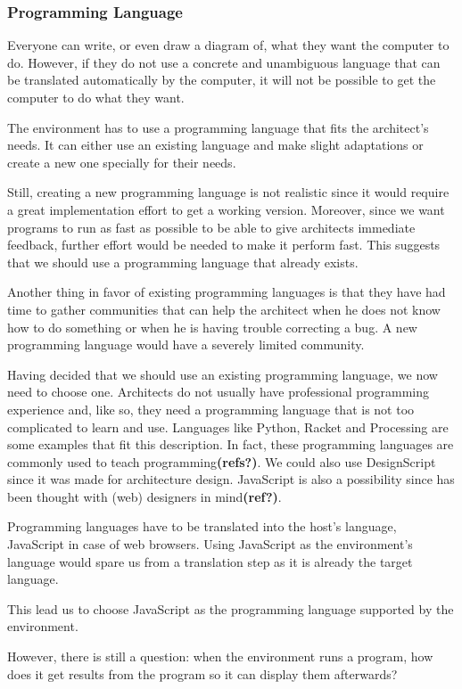 \subsubsection{Programming Language}
Everyone can write, or even draw a diagram of, what they want the computer to do.
However, if they do not use a concrete and unambiguous language that can be translated automatically by the computer, it will not be possible to get the computer to do what they want.

The environment has to use a programming language that fits the architect's needs.
It can either use an existing language and make slight adaptations or create a new one specially for their needs.

Still, creating a new programming language is not realistic since it would require a great implementation effort to get a working version.
Moreover, since we want programs to run as fast as possible to be able to give architects immediate feedback, further effort would be needed to make it perform fast.
This suggests that we should use a programming language that already exists.

Another thing in favor of existing programming languages is that they have had time to gather communities that can help the architect when he does not know how to do something or when he is having trouble correcting a bug.
A new programming language would have a severely limited community.

Having decided that we should use an existing programming language, we now need to choose one.
Architects do not usually have professional programming experience and, like so, they need a programming language that is not too complicated to learn and use.
Languages like Python, Racket and Processing are some examples that fit this description.
In fact, these programming languages are commonly used to teach programming{\bf(refs?)}.
We could also use DesignScript since it was made for architecture design\cite{aish2012designscript}.
JavaScript is also a possibility since has been thought with (web) designers in mind{\bf(ref?)}.

Programming languages have to be translated into the host's language, JavaScript in case of web browsers.
Using JavaScript as the environment's language would spare us from a translation step as it is already the target language.

This lead us to choose JavaScript as the programming language supported by the environment.

However, there is still a question: when the environment runs a program, how does it get results from the program so it can display them afterwards?

